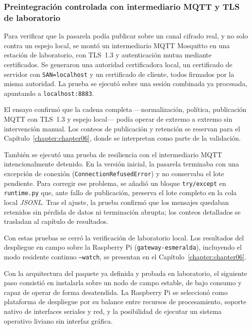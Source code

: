 \subsubsection{Preintegración controlada con intermediario \acs{MQTT} y \acs{TLS} de laboratorio}

Para verificar que la pasarela podía publicar sobre un canal cifrado real, y no solo contra un espejo local, se montó un intermediario \ac{MQTT} Mosquitto en una estación de laboratorio, con \ac{TLS}~1.3 y autenticación mutua mediante certificados. Se generaron una autoridad certificadora local, un certificado de servidor con \texttt{SAN=localhost} y un certificado de cliente, todos firmados por la misma autoridad. La prueba se ejecutó sobre una sesión combinada ya procesada, apuntando a \texttt{localhost:8883}.

El ensayo confirmó que la cadena completa —normalización, política, publicación \acs{MQTT} con \acs{TLS}~1.3 y espejo local— podía operar de extremo a extremo sin intervención manual. Los conteos de publicación y retención se reservan para el Capítulo~\ref{chapter:chapter06}, donde se interpretan como parte de la validación.

También se ejecutó una prueba de resiliencia con el intermediario \ac{MQTT} intencionalmente detenido. En la versión inicial, la pasarela terminaba con una excepción de conexión (\texttt{ConnectionRefusedError}) y no conservaba el lote pendiente. Para corregir ese problema, se añadió un bloque \texttt{try/except} en \texttt{runtime.py} que, ante fallo de publicación, preserva el lote completo en la cola local \textit{JSONL}. Tras el ajuste, la prueba confirmó que los mensajes quedaban retenidos sin pérdida de datos ni terminación abrupta; los conteos detallados se trasladan al capítulo de resultados.

Con estas pruebas se cerró la verificación de laboratorio local. Los resultados del despliegue en campo sobre la Raspberry Pi (\texttt{gateway-esmeralda}), incluyendo el modo residente continuo \texttt{--watch}, se presentan en el Capítulo~\ref{chapter:chapter06}.

Con la arquitectura del paquete ya definida y probada en laboratorio, el siguiente paso consistió en instalarla sobre un nodo de campo estable, de bajo consumo y capaz de operar de forma desatendida. La Raspberry Pi se seleccionó como plataforma de despliegue por su balance entre recursos de procesamiento, soporte nativo de interfaces seriales y red, y la posibilidad de ejecutar un sistema operativo liviano sin interfaz gráfica.

